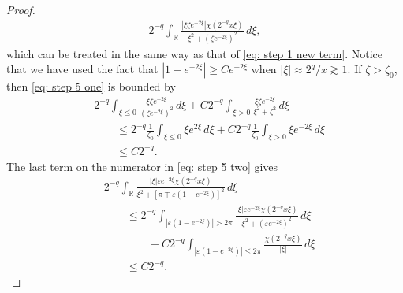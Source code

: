 \documentclass[GreensFunctions.tex]{subfiles}
\begin{document}
\begin{proof}
	\begin{align*}
		2^{-q}
		\int_{\mathbb R} 
			\frac{|\xi \zeta e^{-2\xi} |\chi(2^{-q}x\xi)}{\xi^2+(\zeta e^{-2\xi})^2}
		\,d\xi,	
	\end{align*}
	which can be treated in the same way as that of \eqref{eq: step 1 new term}. Notice 
	that we have used the fact that $|1-e^{-2\xi}|\ge Ce^{-2\xi}$ when 
	$|\xi|\approx 2^q/x\gtrsim 1$. If $\zeta>\zeta_0$, then \eqref{eq: step 5 one} is 
	bounded by
	\begin{align}
		&2^{-q}
			\int_{\xi\le 0} 
				\frac{\xi\zeta e^{-2\xi}}{(\zeta e^{-2\xi})^2}
			\,d\xi 
			+ C 2^{-q}
			\int_{\xi>0} 
				\frac{\xi\zeta e^{-2\xi}}{\xi^2 + \zeta^2}
			\,d\xi
			\\
		&\qquad \le
			2^{-q} \frac1{\zeta_0}
			\int_{\xi\le 0}
				\xi e^{2\xi}
			\,d\xi 
			+ C2^{-q} \frac1{\zeta_0} \int_{\xi>0}\xi e^{-2\xi}\,d\xi
			\\
		&\qquad \le C2^{-q}.
	\end{align}
	The last term on the numerator in \eqref{eq: step 5 two} gives
	\begin{align*}
		&2^{-q}
			\int_{\mathbb R}
				\frac{|\xi|\varepsilon e^{-2\xi} \chi(2^{-q}x\xi)}
					{\xi^2 + [\pi\mp \varepsilon(1-e^{-2\xi})]^2}
			\,d\xi
			\\
		&\qquad \le 2^{-q}
			\int_{|\varepsilon(1-e^{-2\xi})|>2\pi} 
				\frac{|\xi|\varepsilon e^{-2\xi} \chi(2^{-q}x\xi)}
					{\xi^2 + (\varepsilon e^{-2\xi})^2}
				\,d\xi 
				\\
		&\qquad\qquad + C2^{-q}
			\int_{|\varepsilon(1-e^{-2\xi})|\le 2\pi} 
				\frac{\chi(2^{-q}x\xi)}{|\xi|}
			\,d\xi
			\\
		&\qquad\le C2^{-q}.
	\end{align*}


\end{proof}
\end{document}
